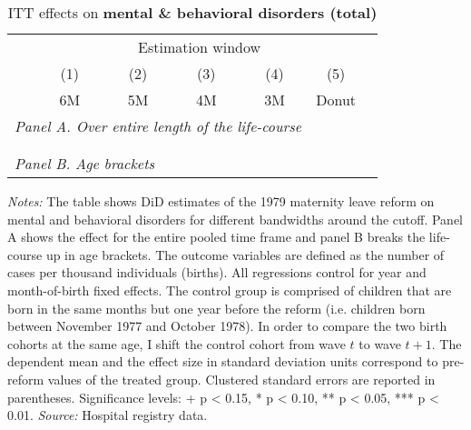 \vspace*{\fill}
\begin{table}[H] \centering 
 \begin{threeparttable} \centering \caption{ITT effects on \textbf{mental \& behavioral disorders (total)}}\label{tab: DD_d5_total}
  {\def\sym#1{\ifmmode^{#1}\else\(^{#1}\)\fi} 
 	\begin{tabular}{l*{6}{c}}
 		\toprule 
 		& \multicolumn{5}{c}{Estimation window} \\ 
 		\cmidrule(lr){2-6}
 		&\multicolumn{1}{c}{(1)}&\multicolumn{1}{c}{(2)}&\multicolumn{1}{c}{(3)}&\multicolumn{1}{c}{(4)}&\multicolumn{1}{c}{(5)}\\
 		&\multicolumn{1}{c}{6M}&\multicolumn{1}{c}{5M}&\multicolumn{1}{c}{4M}&\multicolumn{1}{c}{3M}&\multicolumn{1}{c}{Donut}\\
 		\midrule
 		\multicolumn{5}{l}{\emph{Panel A. Over entire length of the life-course}} \\
 		 \\ \\
 		\multicolumn{5}{l}{\emph{Panel B. Age brackets}} \\
 		    
 		\bottomrule 
 	\end{tabular}}
 	\begin{tablenotes} 
 		\item \scriptsize \emph{Notes:} The table shows DiD estimates of the 1979 maternity leave reform on mental and behavioral disorders for different bandwidths around the cutoff. Panel A shows the effect for the entire pooled time frame and panel B breaks the life-course up in age brackets. The outcome variables are defined as the number of cases per thousand individuals (births). All regressions control for year and month-of-birth fixed effects. The control group is comprised of children that are born in the same months but one year before the reform (i.e. children born between November 1977 and October 1978). In order to compare the two birth cohorts at the same age, I shift the control cohort from wave $t$ to wave $t+1$. The dependent mean and the effect size in standard deviation units correspond to pre-reform values of the treated group. Clustered standard errors are reported in parentheses. \newline Significance levels: + p < 0.15, * p < 0.10, ** p < 0.05, *** p < 0.01. \newline 	\emph{Source:} Hospital registry data.
 	\end{tablenotes} 
 \end{threeparttable} 
 \end{table}
\vspace*{\fill}\clearpage 